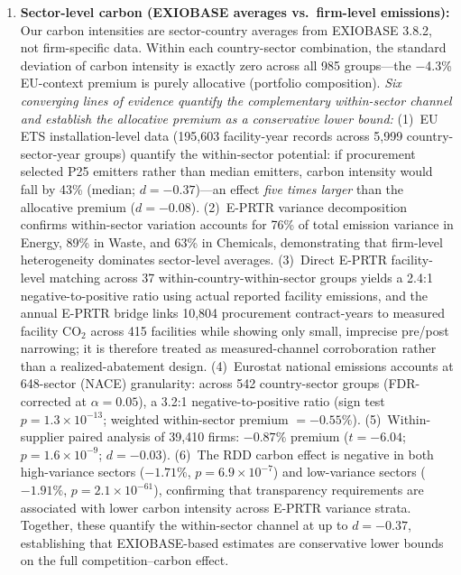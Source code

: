 \documentclass[11pt]{article}
\begin{document}
\begin{enumerate}
\item \textbf{Sector-level carbon (EXIOBASE averages vs.\ firm-level emissions):} Our carbon intensities are sector-country averages from EXIOBASE 3.8.2, not firm-specific data. Within each country-sector combination, the standard deviation of carbon intensity is exactly zero across all 985 groups---the $-$4.3\% EU-context premium is purely allocative (portfolio composition). \textit{Six converging lines of evidence quantify the complementary within-sector channel and establish the allocative premium as a conservative lower bound:} (1)~EU ETS installation-level data (195,603 facility-year records across 5,999 country-sector-year groups) quantify the within-sector potential: if procurement selected P25 emitters rather than median emitters, carbon intensity would fall by 43\% (median; $d = -0.37$)---an effect \textit{five times larger} than the allocative premium ($d = -0.08$). (2)~E-PRTR variance decomposition confirms within-sector variation accounts for 76\% of total emission variance in Energy, 89\% in Waste, and 63\% in Chemicals, demonstrating that firm-level heterogeneity dominates sector-level averages. (3)~Direct E-PRTR facility-level matching across 37 within-country-within-sector groups yields a 2.4:1 negative-to-positive ratio using actual reported facility emissions, and the annual E-PRTR bridge links 10,804 procurement contract-years to measured facility CO$_2$ across 415 facilities while showing only small, imprecise pre/post narrowing; it is therefore treated as measured-channel corroboration rather than a realized-abatement design. (4)~Eurostat national emissions accounts at 648-sector (NACE) granularity: across 542 country-sector groups (FDR-corrected at $\alpha = 0.05$), a 3.2:1 negative-to-positive ratio (sign test $p = 1.3 \times 10^{-13}$; weighted within-sector premium $= -0.55\%$). (5)~Within-supplier paired analysis of 39,410 firms: $-0.87\%$ premium ($t = -6.04$; $p = 1.6 \times 10^{-9}$; $d = -0.03$). (6)~The RDD carbon effect is negative in both high-variance sectors ($-1.71\%$, $p = 6.9 \times 10^{-7}$) and low-variance sectors ($-1.91\%$, $p = 2.1 \times 10^{-61}$), confirming that transparency requirements are associated with lower carbon intensity across E-PRTR variance strata. Together, these quantify the within-sector channel at up to $d = -0.37$, establishing that EXIOBASE-based estimates are conservative lower bounds on the full competition--carbon effect.


\end{enumerate}
\end{document}
